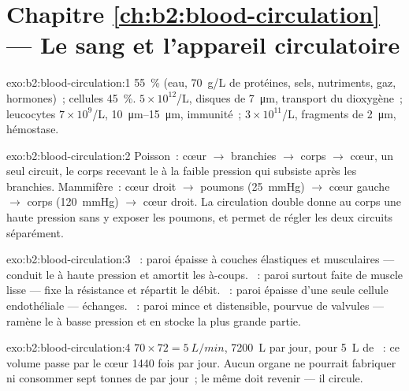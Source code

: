 \section*{Chapitre \ref{ch:b2:blood-circulation} --- Le sang et l'appareil circulatoire}

\begin{solution}{exo:b2:blood-circulation:1}
 \qty{55}{\%} (eau, \qty{70}{g/L} de protéines, sels, nutriments,
gaz, hormones)~; cellules \qty{45}{\%}.  $5\times
10^{12}$/L, disques de \qty{7}{\micro m}, transport du dioxygène~;
leucocytes
$7\times 10^{9}$/L, \qtyrange{10}{15}{\micro m}, immunité~; 
$3\times 10^{11}$/L, fragments de \qty{2}{\micro m}, hémostase.
\end{solution}

\begin{solution}{exo:b2:blood-circulation:2}
Poisson~: cœur $\to$ branchies $\to$ corps $\to$ cœur, un seul circuit,
le corps recevant le  à la faible pression qui subsiste après les
branchies. Mammifère~:
cœur droit $\to$ poumons (\qty{25}{mmHg}) $\to$ cœur gauche $\to$ corps
(\qty{120}{mmHg}) $\to$ cœur droit. La circulation double donne au corps
une haute pression sans y exposer les poumons, et permet de régler les
deux circuits séparément.
\end{solution}

\begin{solution}{exo:b2:blood-circulation:3}
~: paroi épaisse à couches élastiques et musculaires --- conduit le
 à haute pression et amortit les à-coups. ~: paroi surtout
faite de muscle lisse --- fixe la résistance et répartit le débit.
~: paroi épaisse d'une seule cellule endothéliale --- échanges.
~: paroi mince et distensible, pourvue de valvules --- ramène le 
à basse pression et en stocke la plus grande partie.
\end{solution}

\begin{solution}{exo:b2:blood-circulation:4}
$70\times 72 = \qty{5}{L/min}$, \qty{7200}{L} par jour, pour \qty{5}{L}
de ~: ce volume passe par le cœur \num{1440} fois par jour. Aucun
organe ne pourrait fabriquer ni consommer sept tonnes de  par jour~;
le même  doit revenir --- il circule.
\end{solution}

